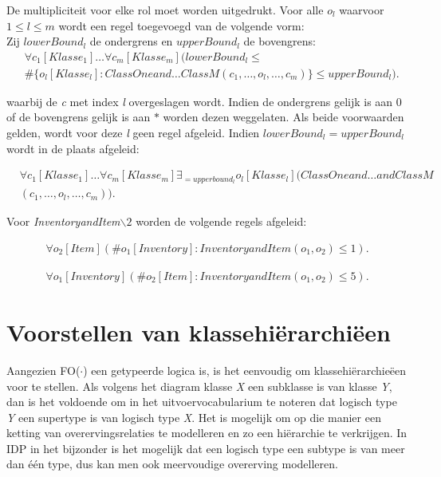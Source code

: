 De multipliciteit voor elke rol moet worden uitgedrukt. Voor alle $o_l$ waarvoor $1 \leq l \leq m$ wordt een regel toegevoegd van de volgende vorm:\\

Zij $lowerBound_l$ de ondergrens en $upperBound_l$ de bovengrens:
\begin{align*}
	&\forall{c_1}[Klasse_1]\ldots\forall{c_m}[Klasse_m](lowerBound_l \leq
	\\
	&\#\{o_l[Klasse_l] : ClassOneand\ldots{}ClassM(c_1,\ldots,o_l,\ldots,c_m)\} \leq upperBound_l).
\end{align*}
	
waarbij de \textit{c} met index \textit{l} overgeslagen wordt. Indien de ondergrens gelijk is aan $0$ of de bovengrens gelijk is aan $*$ worden dezen weggelaten. Als beide voorwaarden gelden, wordt voor deze \textit{l} geen regel afgeleid. Indien $lowerBound_l = upperBound_l$ wordt in de plaats afgeleid:
	
	\begin{align*}
	&\forall{c_1}[Klasse_1]\ldots\forall{c_m}[Klasse_m] \exists_{=upperbound_l}o_l[Klasse_l](ClassOneand\ldots{}andClassM\\&(c_1,\ldots,o_l,\ldots,c_m)).
	\end{align*}
	
	Voor \textit{InventoryandItem$\backslash{}2$} worden de volgende regels afgeleid:
	
\begin{align*}
		\forall{o_2}[Item](\#{o_1[Inventory]: InventoryandItem(o_1,o_2)} \leq 1).
\end{align*} 
		
\begin{align*}
		\forall{o_1}[Inventory](\#{o_2[Item]: InventoryandItem(o_1,o_2)} \leq 5).
\end{align*}

\section{Voorstellen van klassehi\"erarchi\"een}\label{sec:hierarchies}
Aangezien FO($\cdot$) een getypeerde logica is, is het eenvoudig om klassehi\"erarchie\"een voor te stellen. Als volgens het diagram klasse \textit{X} een subklasse is van klasse \textit{Y}, dan is het voldoende om in het uitvoervocabularium te noteren dat logisch type \textit{Y} een supertype is van logisch type \textit{X}. Het is mogelijk om op die manier een ketting van overervingsrelaties te modelleren en zo een hi\"erarchie te verkrijgen. In IDP in het bijzonder is het mogelijk dat een logisch type een subtype is van meer dan \'e\'en type, dus kan men ook meervoudige overerving modelleren.

